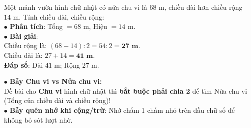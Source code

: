 \documentclass[14pt,a4paper,oneside]{extbook}
\begin{document}
\noindent
\begin{minipage}[t]{0.53\textwidth}
  \begin{tcolorbox}[
    enhanced,
    title={\footnotesize\bfseries\color{white}\faCheckCircle\ Ví dụ thực hành chuẩn mực},
    colback=green!2!white,
    colframe=green!60!black,
    arc=2.5mm, boxrule=0.8pt, top=1.8mm, bottom=1.8mm, left=2.2mm, right=2.2mm
  ]
    \footnotesize
    Một mảnh vườn hình chữ nhật có nửa chu vi là $68\text{ m}$, chiều dài hơn chiều rộng $14\text{ m}$. Tính chiều dài, chiều rộng:\\
    $\bullet$ \textbf{Phân tích}: Tổng $= 68\text{ m}$, Hiệu $= 14\text{ m}$.\\
    $\bullet$ \textbf{Bài giải}:\\
    Chiều rộng là: $(68 - 14) : 2 = 54 : 2 = \mathbf{27\text{ m}}$.\\
    Chiều dài là: $27 + 14 = \mathbf{41\text{ m}}$.\\
    \textbf{Đáp số}: Dài $41\text{ m}$; Rộng $27\text{ m}$.
  \end{tcolorbox}
\end{minipage}%
\hfill
\begin{minipage}[t]{0.45\textwidth}
  \begin{tcolorbox}[
    enhanced,
    title={\footnotesize\bfseries\color{white}\faExclamationTriangle\ Mẹo tránh bẫy trắc nghiệm},
    colback=red!2!white,
    colframe=red!70!black,
    arc=2.5mm, boxrule=0.8pt, top=1.8mm, bottom=1.8mm, left=2.2mm, right=2.2mm
  ]
    \footnotesize
    $\bullet$ \textbf{Bẫy Chu vi vs Nửa chu vi:}\\
    Đề bài cho \textbf{Chu vi} hình chữ nhật thì \textbf{bắt buộc phải chia 2} để tìm Nửa chu vi (Tổng của chiều dài và chiều rộng)!\\
    $\bullet$ \textbf{Bẫy quên nhớ khi cộng/trừ}: Nhớ chấm 1 chấm nhỏ trên đầu chữ số để không bỏ sót lượt nhớ.
  \end{tcolorbox}
\end{minipage}
\end{document}

